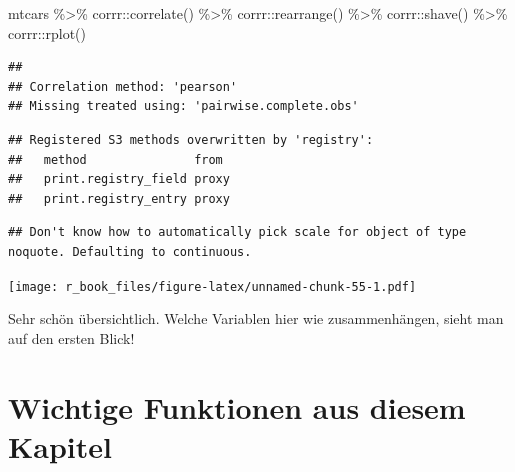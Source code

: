 \documentclass[
]{book}
\newenvironment{Shaded}{\begin{snugshade}}{\end{snugshade}}
\newcommand{\FunctionTok}[1]{\textcolor[rgb]{0.00,0.00,0.00}{#1}}
\newcommand{\NormalTok}[1]{#1}
\newcommand{\SpecialCharTok}[1]{\textcolor[rgb]{0.00,0.00,0.00}{#1}}
\begin{document}
\begin{Shaded}
\begin{Highlighting}[]
\NormalTok{mtcars }\SpecialCharTok{\%\textgreater{}\%} 
\NormalTok{  corrr}\SpecialCharTok{::}\FunctionTok{correlate}\NormalTok{() }\SpecialCharTok{\%\textgreater{}\%}
\NormalTok{  corrr}\SpecialCharTok{::}\FunctionTok{rearrange}\NormalTok{() }\SpecialCharTok{\%\textgreater{}\%}
\NormalTok{  corrr}\SpecialCharTok{::}\FunctionTok{shave}\NormalTok{() }\SpecialCharTok{\%\textgreater{}\%} 
\NormalTok{  corrr}\SpecialCharTok{::}\FunctionTok{rplot}\NormalTok{()}
\end{Highlighting}
\end{Shaded}

\begin{verbatim}
## 
## Correlation method: 'pearson'
## Missing treated using: 'pairwise.complete.obs'
\end{verbatim}

\begin{verbatim}
## Registered S3 methods overwritten by 'registry':
##   method               from 
##   print.registry_field proxy
##   print.registry_entry proxy
\end{verbatim}

\begin{verbatim}
## Don't know how to automatically pick scale for object of type noquote. Defaulting to continuous.
\end{verbatim}

\texttt{[image: r\_book\_files/figure-latex/unnamed-chunk-55-1.pdf]}

Sehr schön übersichtlich. Welche Variablen hier wie zusammenhängen, sieht man auf den ersten Blick!

\hypertarget{wichtige-funktionen-aus-diesem-kapitel-3}{%
\section*{Wichtige Funktionen aus diesem Kapitel}\label{wichtige-funktionen-aus-diesem-kapitel-3}}
\end{document}
